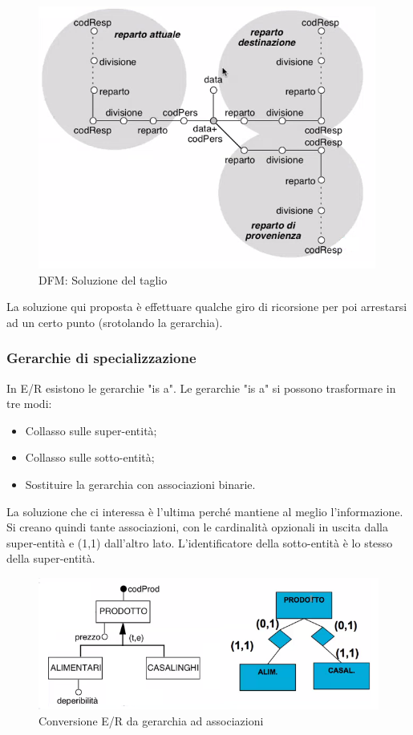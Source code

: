 \begin{figure}[H]
	\begin{center}
		\includegraphics[width=0.5\linewidth]{img/dfmrecsol1.png}
		\caption{DFM: Soluzione del taglio}
	\end{center}
\end{figure}
\noindent La soluzione qui proposta è effettuare qualche giro di ricorsione per poi arrestarsi ad un certo punto (srotolando la gerarchia).
\subsubsection{Gerarchie di specializzazione}
In E/R esistono le gerarchie "is a". Le gerarchie "is a" si possono trasformare in tre modi:
\begin{itemize}
	\item Collasso sulle super-entità;
	\item Collasso sulle sotto-entità;
	\item Sostituire la gerarchia con associazioni binarie.
\end{itemize}
La soluzione che ci interessa è l'ultima perché mantiene al meglio l'informazione. Si creano quindi tante associazioni, con le cardinalità opzionali in uscita dalla super-entità e (1,1) dall'altro lato. L'identificatore della sotto-entità è lo stesso della super-entità.
\begin{figure}[H]
	\begin{center}
		\includegraphics[width=0.8\linewidth]{img/isaconversion.png}
		\caption{Conversione E/R da gerarchia ad associazioni}
	\end{center}
\end{figure}
